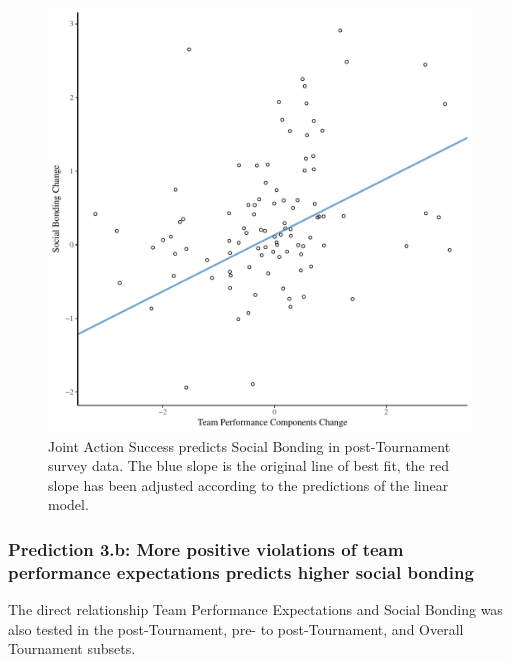   

  \begin{figure}[htbp]
    \centering
  \includegraphics[scale=.5]{images/jasBondDeltaModelSlope.pdf}
    \caption{Joint Action Success predicts Social Bonding in post-Tournament survey data. The blue slope is the original line of best fit, the red slope has been adjusted according to the predictions of the linear model.}
    \label{fig:jasBondDeltaModelSlope}
  \end{figure}









\subsubsection{Prediction 3.b: More positive violations of team performance expectations predicts higher social bonding}

The direct relationship Team Performance Expectations and Social Bonding was also tested in the post-Tournament, pre- to post-Tournament, and Overall Tournament subsets.

